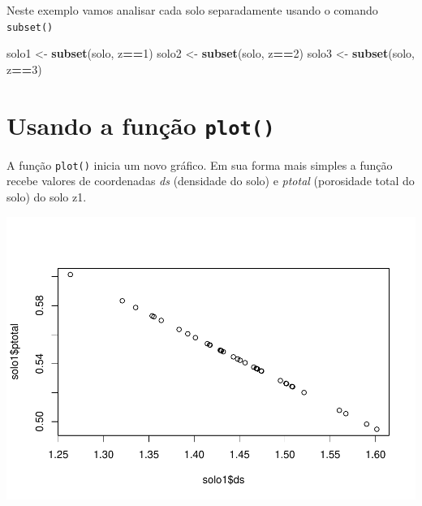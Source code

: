 \documentclass[]{book}
\newenvironment{Shaded}{\begin{snugshade}}{\end{snugshade}}
\newcommand{\DecValTok}[1]{\textcolor[rgb]{0.00,0.00,0.81}{#1}}
\newcommand{\KeywordTok}[1]{\textcolor[rgb]{0.13,0.29,0.53}{\textbf{#1}}}
\newcommand{\NormalTok}[1]{#1}
\newcommand{\OperatorTok}[1]{\textcolor[rgb]{0.81,0.36,0.00}{\textbf{#1}}}
\newcommand{\StringTok}[1]{\textcolor[rgb]{0.31,0.60,0.02}{#1}}
\begin{document}
Neste exemplo vamos analisar cada solo separadamente usando o comando \texttt{subset()}

\begin{Shaded}
\begin{Highlighting}[]
\NormalTok{solo1 <-}\StringTok{ }\KeywordTok{subset}\NormalTok{(solo, z}\OperatorTok{==}\DecValTok{1}\NormalTok{)}
\NormalTok{solo2 <-}\StringTok{ }\KeywordTok{subset}\NormalTok{(solo, z}\OperatorTok{==}\DecValTok{2}\NormalTok{)}
\NormalTok{solo3 <-}\StringTok{ }\KeywordTok{subset}\NormalTok{(solo, z}\OperatorTok{==}\DecValTok{3}\NormalTok{)}
\end{Highlighting}
\end{Shaded}

\hypertarget{usando-a-funcao-plot}{%
\section{\texorpdfstring{Usando a função \texttt{plot()}}{Usando a função plot()}}\label{usando-a-funcao-plot}}

A função \texttt{plot()} inicia um novo gráfico. Em sua forma mais simples a função
recebe valores de coordenadas \emph{ds} (densidade do solo) e \emph{ptotal} (porosidade total do solo) do solo z1.

\begin{Shaded}
\end{Shaded}

\includegraphics{TudodoR_files/figure-latex/unnamed-chunk-152-1.pdf}
\end{document}
